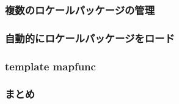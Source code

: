 
\subsubsection{複数のロケールパッケージの管理}

\subsubsection{自動的にロケールパッケージをロード}

\subsubsection{template mapfunc}

\subsubsection{まとめ}

